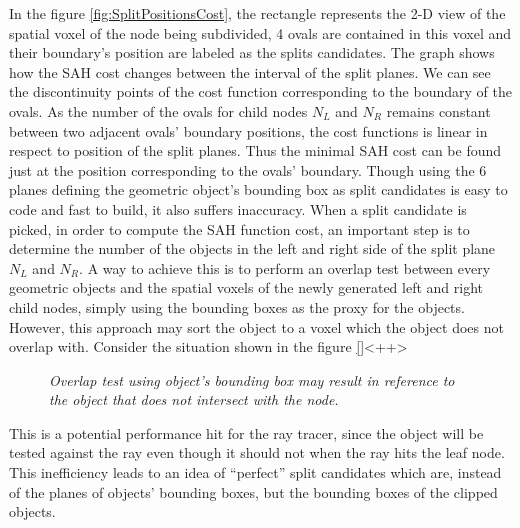 In the figure \ref{fig:SplitPositionsCost}, the rectangle represents the 2-D view of the spatial voxel of the node being subdivided, 4 ovals are contained in this voxel and their boundary's position are labeled as the splits candidates. The graph shows how the SAH cost changes between the interval of the split planes. We can see the discontinuity points of the cost function corresponding to the boundary of the ovals. As the number of the ovals for child nodes \( N_{L} \) and \( N_{R} \) remains constant between two adjacent ovals' boundary positions, the cost functions is linear in respect to position of the split planes. Thus the minimal SAH cost can be found just at the position corresponding to the ovals' boundary. Though using the 6 planes defining the geometric object's bounding box as split candidates is easy to code and fast to build, it also suffers inaccuracy. When a split candidate is picked, in order to compute the SAH function cost, an important step is to determine the number of the objects in the left and right side of the split plane \( N_{L} \) and \( N_{R} \). A \mynaive way to achieve this is to perform an overlap test between every geometric objects and the spatial voxels of the newly generated left and right child nodes, simply using the bounding boxes as the proxy for the objects. However, this approach may sort the object to a voxel which the object does not overlap with. Consider the situation shown in the figure \ref{}<++>      

\begin{figure}[htp] 
    \centering 
    \label{fig:InaccurateOverlap} 
    \renewcommand{\thefigure}{\thechapter.\arabic{figure}}
    \caption[Inaccurate overlap between object and node]{\emph{Overlap test using object's bounding box may result in reference to the object that does not intersect with the node.}}
\end{figure}

This is a potential performance hit for the ray tracer, since the object will be tested against the ray even though it should not when the ray hits the leaf node. This inefficiency leads  to an idea of ``perfect'' split candidates which are, instead of the planes of objects' bounding boxes, but the bounding boxes of the clipped objects.        

